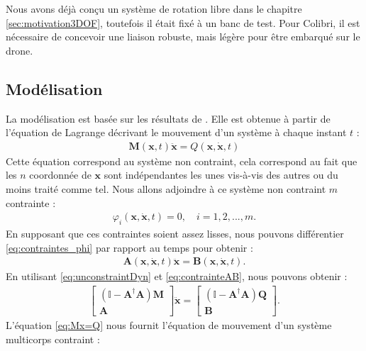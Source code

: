 {\color{blue}
    Nous avons déjà conçu un système de rotation libre dans le chapitre \ref{sec:motivation3DOF}, toutefois il était fixé à un banc de test. Pour Colibri, il est nécessaire de concevoir une liaison robuste, mais légère pour être embarqué sur le drone. 
}
\subsection{Modélisation}
La modélisation est basée sur les résultats de \cite[Équation (2.15)]{udwadia-phohomsiri}. 
Elle est obtenue à partir de l'équation de Lagrange décrivant le mouvement d'un système à chaque instant $t$ :
\begin{align}
    \label{eq:unconstraintDyn}
    \boldsymbol{M}(\boldsymbol{x},t) \ddot{\boldsymbol{x}} = Q(\boldsymbol{x}, \dot{\boldsymbol{x}}, t)
\end{align}
Cette équation correspond au système non contraint, cela correspond au fait que les $n$ coordonnée de $\boldsymbol{x}$ sont indépendantes les unes vis-à-vis des autres ou du moins traité comme tel. Nous allons adjoindre à ce système non contraint $m$ contrainte :
\begin{align}
    \label{eq:contraintes_phi}
    \varphi_{i}(\boldsymbol{x},\dot{\boldsymbol{x}},t) = 0, \quad i=1,2,...,m.
\end{align}
En supposant que ces contraintes soient assez lisses, nous pouvons différentier \eqref{eq:contraintes_phi} par rapport au temps pour obtenir : 
\begin{align}
    \label{eq:contrainteAB}
    \boldsymbol{A}(\boldsymbol{x},\dot{\boldsymbol{x}}, t) \ddot{\boldsymbol{x}} = \boldsymbol{B}(\boldsymbol{x},\dot{\boldsymbol{x}},t).
\end{align}
En utilisant \eqref{eq:unconstraintDyn} et \eqref{eq:contrainteAB}, nous pouvons obtenir :
\begin{align}
    \label{eq:Mx=Q}
    \begin{bmatrix} (\mathbb{I} - \boldsymbol{A}^{\dag}\boldsymbol{A})\boldsymbol{M} \\ \boldsymbol{A} \end{bmatrix}  \ddot{\boldsymbol{x}}  =  \begin{bmatrix} (\mathbb{I} - \boldsymbol{A}^{\dag}\boldsymbol{A}) \boldsymbol{Q} \\ \boldsymbol{B} \end{bmatrix}.
\end{align}
 L'équation \eqref{eq:Mx=Q} nous fournit l'équation de mouvement d'un système multicorps contraint : 
